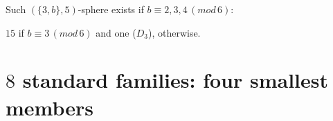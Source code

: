 \documentclass{beamer}
\begin{document}
\begin{frame}
Such ${(\{3,b\},5)}$-sphere  exists
if
$b\equiv 2,3,4\,(mod\,6)$:

$15$  if $b\equiv 3\,(mod\,6)$
and one ($D_{3}$), 
otherwise.

\end{frame}


\section[]{$8$ standard families: four  smallest members}

\frame{
\begin{center}
\begin{tabular*}{7cm}{c}
\\[-0.5cm]
{\Huge \textcolor{blue}{III. }\textcolor{red}{
$8$ standard families:}}
\\[4mm]{\Huge \textcolor{red}{
$4$ smallest members}
}
\end{tabular*}
\end{center}
}
\end{document}
